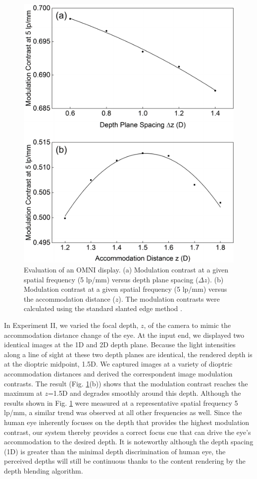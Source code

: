 \documentclass[9pt,twocolumn,twoside]{osajnl}
\begin{document}
\begin{figure}[htbp]
	\centering
	\includegraphics[width=\linewidth]{OMNIfig4}
	\caption{Evaluation of an OMNI display. (a) Modulation contrast at a given spatial frequency (5 lp/mm) versus depth plane spacing ($\Delta z$). (b) Modulation contrast at a given spatial frequency (5 lp/mm) versus the accommodation distance ($z$). The modulation contrasts were calculated using the standard slanted edge method \cite{hu2014design}.}
	\label{fig:4}
\end{figure} 
In Experiment II, we varied the focal depth, $z$, of the camera to mimic the accommodation distance change of the eye. At the input end, we displayed two identical images at the 1D and 2D depth plane. Because the light intensities along a line of sight at these two depth planes are identical, the rendered depth is at the dioptric midpoint, 1.5D. We captured images at a variety of dioptric accommodation distances and derived the correspondent image modulation contrasts. The result (Fig. \ref{fig:4}(b)) shows that the modulation contrast reaches the maximum at $z$=1.5D and degrades smoothly around this depth. Although the results shown in Fig. \ref{fig:4} were measured at a representative spatial frequency 5 lp/mm, a similar trend was observed at all other frequencies as well. Since the human eye inherently focuses on the depth that provides the highest modulation contrast, our system thereby provides a correct focus cue that can drive the eye’s accommodation to the desired depth. It is noteworthy although the depth spacing (1D) is greater than the minimal depth discrimination of human eye, the perceived depths will still be continuous thanks to the content rendering by the depth blending algorithm.\par
\end{document}
